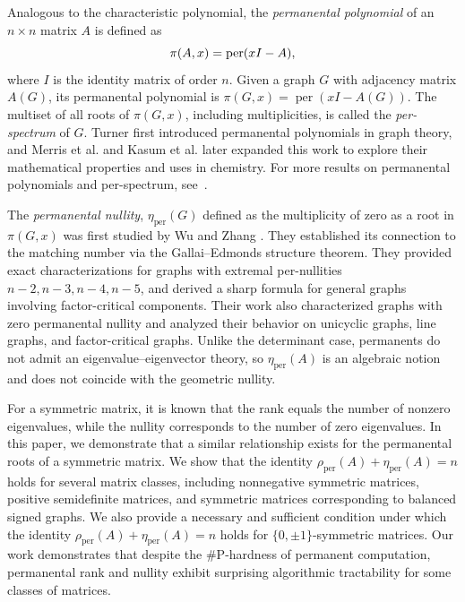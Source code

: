 \documentclass[11pt]{article}
\DeclareMathOperator{\per}{per}
\theoremstyle{plain}
\theoremstyle{definition}
\theoremstyle{remark}
\begin{document}
Analogous to the characteristic polynomial, the \textit{permanental polynomial} of an
$n \times n$ matrix \(A\) is defined as
\begin{equation}
    \pi(A, x) = \per(xI-A), \notag
\end{equation}
where \(I\) is the identity matrix of order $n$. Given a graph $G$ with adjacency matrix $A(G)$, its permanental polynomial is $\pi(G, x) = \per(xI-A(G))$. The multiset of all roots of $\pi(G, x)$, including multiplicities, is called the \textit{per-spectrum} of $G$.
Turner \cite{turner1968generalized} first introduced permanental polynomials in graph theory, and Merris et al. \cite{merris1981permanental} and Kasum et al. \cite{kasum1981chemical} later expanded this work to explore their mathematical properties and uses in chemistry.
For more results on permanental polynomials and per-spectrum, see~\cite{bapat2024computing, cash2000permanental,gutman1998permanents, liu2013characterizing,   singh2024note,  zhang2015per}.





The \textit{permanental nullity}, \( \eta_{\text{per}}(G) \) defined as the multiplicity of zero as a root in \( \pi(G, x) \) was first studied by Wu and Zhang \cite{wu2015per}. They established its connection to the matching number via the Gallai--Edmonds structure theorem. They provided exact characterizations for graphs with extremal per-nullities \( n - 2, n - 3, n - 4, n - 5 \), and derived a sharp formula for general graphs involving factor-critical components. Their work also characterized graphs with zero permanental nullity and analyzed their behavior on unicyclic graphs, line graphs, and factor-critical graphs. Unlike the determinant case, permanents do not admit an eigenvalue–eigenvector
theory, so \(\eta_{\mathrm{per}}(A)\) is an algebraic notion and does not coincide
with the geometric nullity.



For a symmetric matrix, it is known that the rank equals the number of nonzero eigenvalues, while the nullity corresponds to the number of zero eigenvalues. In this paper, we demonstrate that a similar relationship exists for the permanental roots of a symmetric matrix. We show that the identity $\rho_{\mathrm{per}}(A) + \eta_{\mathrm{per}}(A) = n$ holds for several matrix classes, including nonnegative symmetric matrices, positive semidefinite matrices, and symmetric matrices corresponding to balanced signed graphs. We also provide a necessary and sufficient condition under which the identity $\rho_{\mathrm{per}}(A) + \eta_{\mathrm{per}}(A) = n$ holds for  $\{0,\pm1\}$-symmetric matrices. Our work demonstrates that despite the \#P-hardness of permanent computation, permanental rank and nullity exhibit surprising algorithmic tractability for some classes of matrices.
\end{document}
